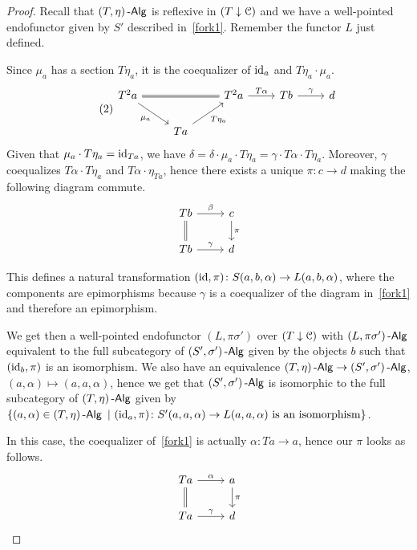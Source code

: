 \documentclass[a4paper,11pt,oneside,openany]{scrbook}
\begin{document}
\begin{proof}
    Recall that $(T,\eta)\operatorname{-\mathsf{Alg}}$ is reflexive in $(T\downarrow\operatorname{\mathcal{C}})$ and we have a well-pointed endofunctor given by $S'$ described in~\ref{fork1}. Remember the functor $L$ just defined.
    
    Since $\mu_a$ has a section $T\eta_a$, it is the coequalizer of $\operatorname{id}_a$ and $T\eta_a\cdot\mu_a$.
    \[
    \tag{2}\label{fork2}
    \begin{tikzcd}
    T^2a\ar[rr, equal]\ar[dr, swap, "\mu_a"]
    && T^2a\ar[r, "T\alpha"]
    & Tb\ar[r, "\gamma"]
    & d \\
    & Ta\ar[ur, swap, "T\eta_a"]
    \end{tikzcd}
    \]
    Given that $\mu_a\cdot T\eta_a=\operatorname{id}_{Ta}$, we have $\delta=\delta\cdot\mu_a\cdot T\eta_a=\gamma\cdot T\alpha\cdot T\eta_a$. Moreover, $\gamma$ coequalizes $T\alpha\cdot T\eta_a$ and $T\alpha\cdot\eta_{Ta}$, hence there exists a unique $\pi\colon c\rightarrow d$ making the following diagram commute.
    \[
    \begin{tikzcd}
        Tb\ar[d, equal]\ar[r, "\beta"]
        & c\ar[d, "\pi"] \\
        Tb\ar[r, "\gamma"]
        & d
    \end{tikzcd}
    \]
    
    This defines a natural transformation $(\operatorname{id},\pi)\colon S(a,b,\alpha)\rightarrow L(a,b,\alpha)$, where the components are epimorphisms because $\gamma$ is a coequalizer of the diagram in~\ref{fork1} and therefore an epimorphism.
    
    We get then a well-pointed endofunctor $(L,\pi\sigma')$ over $(T\downarrow\operatorname{\mathcal{C}})$ with $(L,\pi\sigma')\operatorname{-\mathsf{Alg}}$ equivalent to the full subcategory of $(S',\sigma')\operatorname{-\mathsf{Alg}}$ given by the objects $b$ such that $(\operatorname{id}_b,\pi)$ is an isomorphism. We also have an equivalence $(T,\eta)\operatorname{-\mathsf{Alg}}\rightarrow (S',\sigma')\operatorname{-\mathsf{Alg}}$, $(a,\alpha)\mapsto (a,a,\alpha)$, hence we get that $(S',\sigma')\operatorname{-\mathsf{Alg}}$ is isomorphic to the full subcategory of $(T,\eta)\operatorname{-\mathsf{Alg}}$ given by $\{(a,\alpha)\in (T,\eta)\operatorname{-\mathsf{Alg}}\ |\ (\operatorname{id}_a,\pi)\colon S'(a,a,\alpha)\rightarrow L(a,a,\alpha)\text{ is an isomorphism}\}$.
    
    In this case, the coequalizer of~\ref{fork1} is actually $\alpha\colon Ta\rightarrow a$, hence our $\pi$ looks as follows.
    \[
    \begin{tikzcd}
        Ta\ar[d, equal]\ar[r, "\alpha"]
        & a\ar[d, "\pi"] \\
        Ta\ar[r, "\gamma"]
        & d
    \end{tikzcd}
    \]
    

\end{proof}
\end{document}

